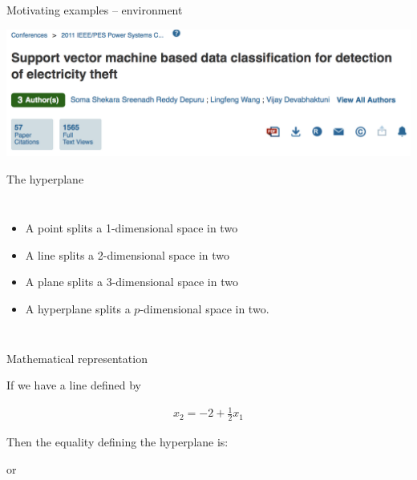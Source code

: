 \documentclass[mathserif, aspectratio=169]{beamer}
\begin{document}
\begin{frame}{Motivating examples -- environment}



\includegraphics[scale=0.4]{depuru_etal_SVMTheft}





\end{frame}


\begin{frame}{The hyperplane}
\begin{columns}
\begin{itemize}
\item A point splits a 1-dimensional space in two
\vspace{5mm}
\item A line splits a 2-dimensional space in two
\vspace{5mm}
\item A plane splits a 3-dimensional space in two
\vspace{5mm}
\item A hyperplane splits a $p$-dimensional space in two.  
\end{itemize}

\end{columns}
\end{frame}

\begin{frame}{Mathematical representation}

If we have a line defined by

\begin{align*}
x_2 = -2+\frac{1}{2} x_1
\end{align*}

Then the equality defining the hyperplane is:

\vspace{15mm}
or

\vspace{15mm}
\end{frame}
\end{document}
